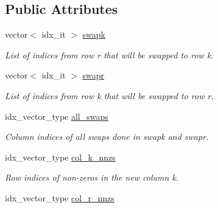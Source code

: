 \subsection*{Public Attributes}
\begin{DoxyCompactItemize}
\item 
vector$<$ idx\+\_\+it $>$ \hyperlink{classswap__struct_a609dd0d32e04b30b0db6830ab56a8de9}{swapk}\hypertarget{classswap__struct_a609dd0d32e04b30b0db6830ab56a8de9}{}\label{classswap__struct_a609dd0d32e04b30b0db6830ab56a8de9}

\begin{DoxyCompactList}\small\item\em List of indices from row r that will be swapped to row k. \end{DoxyCompactList}\item 
vector$<$ idx\+\_\+it $>$ \hyperlink{classswap__struct_a145f164cc7d5b81b259f0fe558faacf9}{swapr}\hypertarget{classswap__struct_a145f164cc7d5b81b259f0fe558faacf9}{}\label{classswap__struct_a145f164cc7d5b81b259f0fe558faacf9}

\begin{DoxyCompactList}\small\item\em List of indices from row k that will be swapped to row r. \end{DoxyCompactList}\item 
idx\+\_\+vector\+\_\+type \hyperlink{classswap__struct_af5461fcf0c0808ef0ef5ac9c6e212839}{all\+\_\+swaps}\hypertarget{classswap__struct_af5461fcf0c0808ef0ef5ac9c6e212839}{}\label{classswap__struct_af5461fcf0c0808ef0ef5ac9c6e212839}

\begin{DoxyCompactList}\small\item\em Column indices of all swaps done in swapk and swapr. \end{DoxyCompactList}\item 
idx\+\_\+vector\+\_\+type \hyperlink{classswap__struct_a7a9e67b4e6e1b9d1e6d2aefef3edda71}{col\+\_\+k\+\_\+nnzs}\hypertarget{classswap__struct_a7a9e67b4e6e1b9d1e6d2aefef3edda71}{}\label{classswap__struct_a7a9e67b4e6e1b9d1e6d2aefef3edda71}

\begin{DoxyCompactList}\small\item\em Row indices of non-\/zeros in the new column k. \end{DoxyCompactList}\item 
idx\+\_\+vector\+\_\+type \hyperlink{classswap__struct_a8d4e30cd03fc142b81a332db04edc244}{col\+\_\+r\+\_\+nnzs}\hypertarget{classswap__struct_a8d4e30cd03fc142b81a332db04edc244}{}\label{classswap__struct_a8d4e30cd03fc142b81a332db04edc244}


\end{DoxyCompactItemize}
